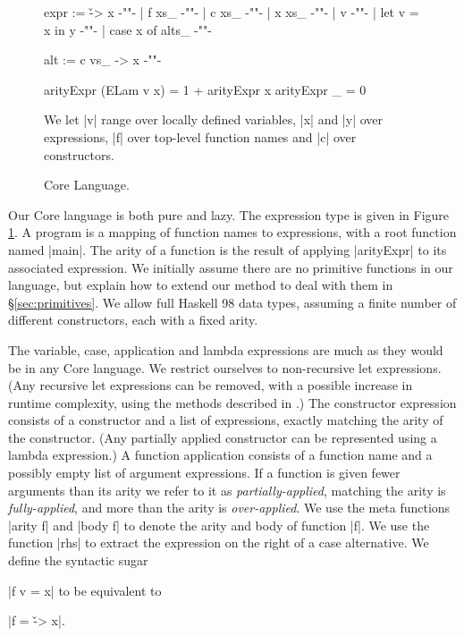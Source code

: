 \documentclass[preprint]{sigplanconf}
\begin{document}
\begin{figure}
\ignore\begin{code}
expr  :=  \v -> x           {-""-}
      |   f xs_             {-""-}
      |   c xs_             {-""-}
      |   x xs_             {-""-}
      |   v                 {-""-}
      |   let v = x in y    {-""-}
      |   case x of alts_   {-""-}

alt   :=  c vs_ -> x        {-""-}
\end{code}
\begin{code}
arityExpr (ELam v x)  = 1 + arityExpr x
arityExpr _           = 0
\end{code}

We let |v| range over locally defined variables, |x| and |y| over expressions, |f| over top-level function names and |c| over constructors.
\caption{Core Language.}
\label{fig:core}
\end{figure}

Our Core language is both pure and lazy. The expression type is given in Figure \ref{fig:core}. A program is a mapping of function names to expressions, with a root function named |main|. The arity of a function is the result of applying |arityExpr| to its associated expression. We initially assume there are no primitive functions in our language, but explain how to extend our method to deal with them in \S\ref{sec:primitives}. We allow full Haskell 98 data types, assuming a finite number of different constructors, each with a fixed arity.

The variable, case, application and lambda expressions are much as they would be in any Core language. We restrict ourselves to non-recursive let expressions. (Any recursive let expressions can be removed, with a possible increase in runtime complexity, using the methods described in \cite{me:thesis}.) The constructor expression consists of a constructor and a list of expressions, exactly matching the arity of the constructor. (Any partially applied constructor can be represented using a lambda expression.) A function application consists of a function name and a possibly empty list of argument expressions. If a function is given fewer arguments than its arity we refer to it as \textit{partially-applied}, matching the arity is \textit{fully-applied}, and more than the arity is \textit{over-applied}. We use the meta functions |arity f| and |body f| to denote the arity and body of function |f|. We use the function |rhs| to extract the expression on the right of a case alternative. We define the syntactic sugar \ignore|f v = x| to be equivalent to \ignore|f = \v -> x|.
\end{document}
